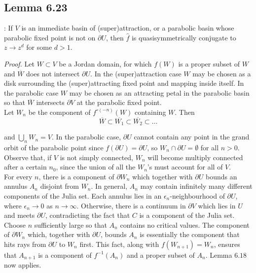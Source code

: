 \documentclass[11pt,a4paper]{article}
\begin{document}

    \subsection*{Lemma 6.23}: If $V$ is an immediate basin of (super)attraction, or a parabolic basin whose parabolic fixed point is not on $\partial U$, then $\hat{f}$ is quasisymmetrically conjugate to $z\rightarrow z^d$ for some $d>1$.


    \textit{Proof.} Let $W \subset V$ be a Jordan domain, for which $f(W)$ is a proper subset of $W$ and $\overline{W}$ does not intersect $\partial U$. In the (super)attraction case $W$ may be chosen as a disk surrounding the (super)attracting fixed point and mapping inside itself. In the parabolic case $W$ may be chosen as an attracting petal in the parabolic basin so that $\overline{W}$ intersects $\partial V$ at the parabolic fixed point.\\
    Let $W_n$ be the component of $f^{\circ (-n)}(W)$ containing $W$. Then
    $$\overline{W} \subset \overline{W_1} \subset \overline{W_2} \subset \ldots
    $$

    and $\bigcup_{n}{W_n} = V$. In the parabolic case, $\partial U$ cannot contain any point in the grand orbit of the parabolic point since $f(\partial U) = \partial U$, so $W_n \cap \partial U = \emptyset$ for all $n>0$. Observe that, if $V$ is not simply connected, $W_n$ will become multiply connected after a certain $n_0$, since the union of all the $W_n$'s must account for all of $V$.\\
    For every $n$, there is a component of $\partial W_n$ which together with $\partial U$ bounds an annulus $A_n$ disjoint from $W_n$. In general, $A_n$ may contain infinitely many different components of the Julia set. Each annulus lies in an $\epsilon_n$-neighbourhood of $\partial U$, where $\epsilon_n \rightarrow 0$ as $n\rightarrow \infty$. Otherwise, there is a continuum in $\partial V$ which lies in $U$ and meets $\partial U$, contradicting the fact that $C$ is a component of the Julia set.\\
    Choose $n$ sufficiently large so that $A_n$ contains no critical values. The component of $\partial W_n$ which, together with $\partial U$, bounds $A_n$ is essentially the component that hits rays from $\partial U$ to $W_n$ first. This fact, along with $f(W_{n+1}) = W_n$, ensures that $A_{n+1}$ is a component of $f^{-1}(A_n)$ and a proper subset of $A_n$. Lemma $6.18$ now applies.
\end{document}
